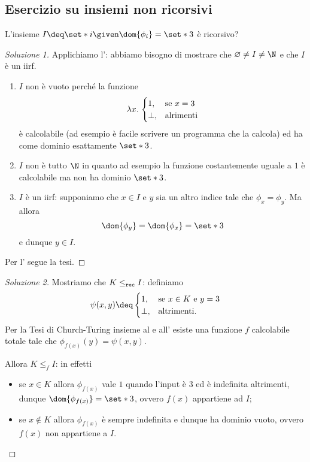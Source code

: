 \subsection*{Esercizio su insiemi non ricorsivi}

L'insieme $I \deq \set*{i \given \dom{\phi_i} = \set*{3}}$ è ricorsivo?

\begin{proof}
    [Soluzione 1]
    Applichiamo l': abbiamo bisogno di mostrare che $\varnothing \neq I \neq \N$ e che $I$ è un iirf.
    \begin{enumerate}[(1)]
        \item $I$ non è vuoto perché la funzione \[
            \lambda{x}.\ {
                \begin{cases}
                    1, &\text{se } x = 3\\
                    \bot, &\text{alrimenti}
                \end{cases}
            }
        \] è calcolabile (ad esempio è facile scrivere un programma \WHILE{} che la calcola) ed ha come dominio esattamente $\set*{3}$.
        \item $I$ non è tutto $\N$ in quanto ad esempio la funzione costantemente uguale a $1$ è calcolabile ma non ha dominio $\set*{3}$.
        \item $I$ è un iirf: supponiamo che $x \in I$ e $y$ sia un altro indice tale che $\phi_x = \phi_y$. Ma allora \[
            \dom{\phi_y} = \dom{\phi_x} = \set*{3}
        \] e dunque $y \in I$. 
    \end{enumerate}

    Per l' segue la tesi.
\end{proof}

\begin{proof}
    [Soluzione 2]
    Mostriamo che $K \leq_{\texttt{rec}} I$: definiamo \[
        \psi(x, y) \deq \begin{cases}
            1, &\text{se } x \in K \text{ e } y = 3\\
            \bot, &\text{altrimenti.}
        \end{cases}
    \] Per la Tesi di Church-Turing insieme al  e all' esiste una funzione $f$ calcolabile totale tale che $\phi_{f(x)}(y) = \psi(x, y)$.
    
    Allora $K \leq_f I$: in effetti \begin{itemize}
        \item se $x \in K$ allora $\phi_{f(x)}$ vale $1$ quando l'input è $3$ ed è indefinita altrimenti, dunque $\dom{\phi_{f(x)}} = \set*{3}$, ovvero $f(x)$ appartiene ad $I$;
        \item se $x \notin K$ allora $\phi_{f(x)}$ è sempre indefinita e dunque ha dominio vuoto, ovvero $f(x)$ non appartiene a $I$.        
    \end{itemize} 
\end{proof}